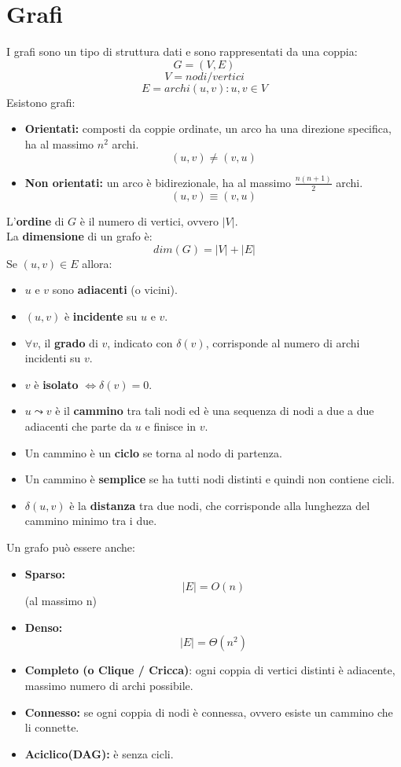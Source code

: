 \documentclass[a4paper,12pt]{article}
\let\oldsection\section
\renewcommand{\section}{\clearpage\oldsection}
\begin{document}
\section{Grafi}
I grafi sono un tipo di struttura dati e sono rappresentati da una coppia:
\[
G = (V,E)
\]
\[
V = nodi/vertici
\]
\[
E = archi (u,v): u,v \in V
\]
Esistono grafi:
\begin{itemize}
    \item \textbf{Orientati:} composti da coppie ordinate, un arco ha una direzione specifica, ha al massimo $n^2$ archi.
    \[(u,v) \ne (v,u)\]
    \item \textbf{Non orientati:} un arco è bidirezionale, ha al massimo $\frac{n(n+1)}{2}$ archi.
    \[
    (u,v) \equiv (v,u)
    \]
\end{itemize}
L'\textbf{ordine} di $G$ è il numero di vertici, ovvero $|V|$.\\
La \textbf{dimensione} di un grafo è:
\[
dim(G) = |V| + |E|
\]
Se $(u,v) \in E$ allora:
\begin{itemize}
    \item $u$ e $v$ sono \textbf{adiacenti} (o vicini).
    \item $(u,v)$ è \textbf{incidente} su $u$ e $v$.
    \item $\forall v$, il \textbf{grado} di $v$, indicato con $\delta(v)$, corrisponde al numero di archi incidenti su $v$.
    \item $v$ è \textbf{isolato} $\Leftrightarrow \delta(v) = 0$.
    \item $u \leadsto v$ è il \textbf{cammino} tra tali nodi ed è una sequenza di nodi a due a due adiacenti che parte da $u$ e finisce in $v$.
    \item Un cammino è un \textbf{ciclo} se torna al nodo di partenza.
    \item Un cammino è \textbf{semplice} se ha tutti nodi distinti e quindi non contiene cicli.
    \item $\delta(u,v)$ è la \textbf{distanza} tra due nodi, che corrisponde alla lunghezza del cammino minimo tra i due.
\end{itemize}
Un grafo può essere anche:
\begin{itemize}
    \item \textbf{Sparso:}
    \[
    |E| = O(n) 
    \]
    (al massimo n)
    \item \textbf{Denso:}
    \[
    |E| = \Theta(n^2)
    \]
    \item \textbf{Completo (o Clique / Cricca)}: ogni coppia di vertici distinti è adiacente, massimo numero di archi possibile.
    \item \textbf{Connesso:} se ogni coppia di nodi è connessa, ovvero esiste un cammino che li connette.
    \item \textbf{Aciclico(DAG):} è senza cicli.
\end{itemize}
\end{document}
